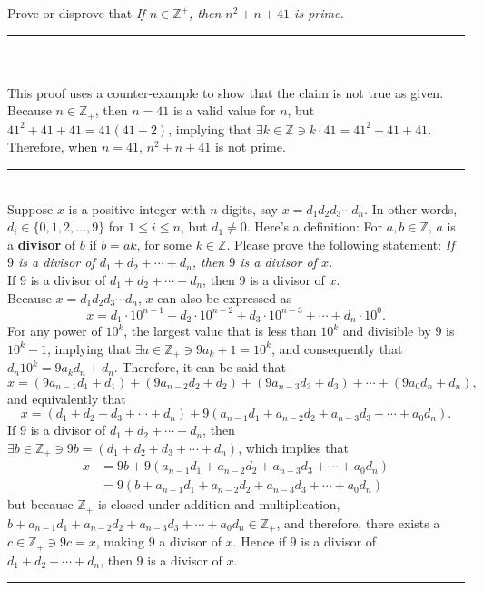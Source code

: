 \documentclass{article}
\newcommand{\Z}{\mathbb{Z}}
\begin{document}
 Prove or disprove that \emph{If $n \in \Z^+$, then $n^2 + n +41$ is prime.}
\\\rule{\textwidth}{0.4pt} 
\\[0.05in]\noindent{\it Claim: If $n \in \Z^+$, then $n^2 + n +41$ is prime.}
\\[0.05in] This proof uses a counter-example to show that the claim is not true as given.  Because $n\in \mathbb{Z}_{+}$, then $n=41$ is a valid value for $n$, but $41^2 + 41 + 41 = 41(41 + 2)$, implying that $\exists k \in \mathbb{Z} \ni k\cdot41 = 41^2 + 41 + 41$. Therefore, when $n=41$, $n^2 + n + 41$ is not prime.
\\[0.05in]\rule{\textwidth}{0.4pt} 
\\[0.05in]Suppose $x$ is a positive integer with $n$ digits, say $x = d_1d_2d_3\cdots d_n$. In other words,
$d_i \in \{0,1,2,\dots, 9\}$ for $1 \leq i \leq n$, but
$d_1 \neq 0$.  Here's a definition: For $a, b \in \Z$, $a$ is a {\bf divisor} of $b$ if $b = ak$, for some $k \in \Z$.
Please prove the following statement: \emph{If $9$ is a divisor of $d_1 + d_2 + \cdots + d_n$, then $9$ is a divisor of $x$.}
\\[0.05in]If $9$ is a divisor of $d_1 + d_2 + \cdots + d_n$, then $9$ is a divisor of $x$.
\\[0.05in] Because $x = d_1d_2d_3\cdots d_n$, $x$ can also be expressed as
\begin{equation*}
	x = d_1\cdot 10^{n-1} + d_2\cdot 10^{n-2} + d_3\cdot 10^{n-3} + \cdots + d_n\cdot 10^{0}.
\end{equation*}
For any power of $10^k$, the largest value that is less than $10^k$ and divisible by $9$ is $10^k - 1$, implying that $\exists a \in \mathbb{Z}_{+} \ni 9a_k + 1 = 10^k$, and consequently that $d_n10^k = 9a_kd_n + d_n$. Therefore, it can be said that 
\begin{equation*}
x = (9a_{n-1}d_1 + d_1) + (9a_{n-2}d_2 + d_2) + (9a_{n-3}d_3 + d_3) + \cdots + (9a_0d_n + d_n),
\end{equation*}
and equivalently that
\begin{equation*}
x = (d_1 + d_2 + d_3 + \cdots + d_n) + 9(a_{n-1}d_1 + a_{n-2}d_2 + a_{n-3}d_3 + \cdots + a_0d_n) .
\end{equation*}
If $9$ is a divisor of $d_1 + d_2 + \cdots + d_n$, then $\exists b \in \mathbb{Z}_{+} \ni 9b = (d_1 + d_2 + d_3 + \cdots + d_n)$, which implies that 
\begin{equation*}\begin{aligned}
x &= 9b + 9(a_{n-1}d_1 + a_{n-2}d_2 + a_{n-3}d_3 + \cdots + a_0d_n) \\
  &= 9(b + a_{n-1}d_1 + a_{n-2}d_2 + a_{n-3}d_3 + \cdots + a_0d_n)
\end{aligned}\end{equation*}
but because $\mathbb{Z}_{+}$ is closed under addition and multiplication, $b + a_{n-1}d_1 + a_{n-2}d_2 + a_{n-3}d_3 + \cdots + a_0d_n \in \mathbb{Z}_{+}$, and therefore, there exists a $c \in \mathbb{Z}_{+} \ni 9c = x$, making $9$ a divisor of $x$. Hence if $9$ is a divisor of $d_1 + d_2 + \cdots + d_n$, then $9$ is a divisor of $x$.
\\[0.05in]\rule{\textwidth}{0.4pt}
\end{document}
